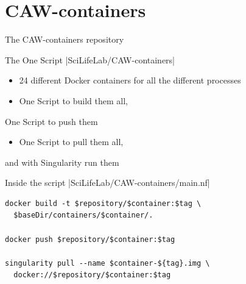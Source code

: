 \documentclass{beamer}
\begin{document}
\section{CAW-containers}

\begin{frame}{The CAW-containers repository}
\end{frame}

\begin{frame}{The One Script}
	|SciLifeLab/CAW-containers|
	\begin{itemize}
		\item 24 different Docker containers for all the different processes
		\pause
		\item One Script to build them all,
		\pause
	\end{itemize}
	\hfill One Script to push them \hspace{1.5cm}
	\pause
	\begin{itemize}
		\item One Script to pull them all,
	\end{itemize}
	\pause
	\hfill and with Singularity run them \hspace{1.5cm}
\end{frame}

\begin{frame}[fragile]{Inside the script}
|SciLifeLab/CAW-containers/main.nf|
\begin{verbatim}
docker build -t $repository/$container:$tag \
  $baseDir/containers/$container/.

docker push $repository/$container:$tag

singularity pull --name $container-${tag}.img \
  docker://$repository/$container:$tag
\end{verbatim}
\end{frame}
\end{document}
